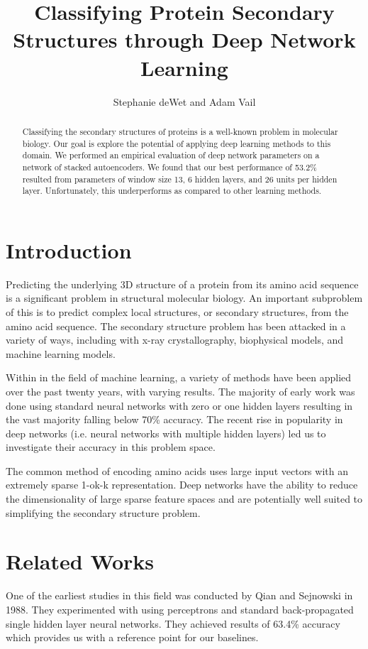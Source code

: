 \documentclass[letterpaper,twocolumn,12pt]{article}
\title{Classifying Protein Secondary Structures through Deep Network Learning}
\author{Stephanie deWet and Adam Vail}
\begin{document}
\maketitle

\begin{abstract}
Classifying the secondary structures of proteins is a well-known problem in molecular biology.
Our goal is explore the potential of applying deep learning methods to this domain.
We performed an empirical evaluation of deep network parameters on a network of stacked autoencoders.
We found that our best performance of 53.2\% resulted from parameters of window size 13, 6 hidden layers, and 26 units per hidden layer.
Unfortunately, this underperforms as compared to other learning methods.
\end{abstract}

\section{Introduction}
\label{subsec:intro}
Predicting the underlying 3D structure of a protein from its amino acid sequence is a significant problem in structural molecular biology.
An important subproblem of this is to predict complex local structures, or secondary structures, from the amino acid sequence.  
The secondary structure problem has been attacked in a variety of ways, including with x-ray crystallography, biophysical models, and machine learning models.

Within in the field of machine learning, a variety of methods have been applied over the past twenty years, with varying results. 
The majority of early work was done using standard neural networks with zero or one hidden layers resulting in the vast majority falling below 70\% accuracy.
The recent rise in popularity in deep networks (i.e. neural networks with multiple hidden layers) led us to investigate their accuracy in this problem space.

The common method of encoding amino acids uses large input vectors with an extremely sparse 1-ok-k representation.
Deep networks have the ability to reduce the dimensionality of large sparse feature spaces and are potentially well suited to simplifying the secondary structure problem.

\section{Related Works}
\label{subsec:relatedworks}
One of the earliest studies in this field was conducted by Qian and Sejnowski \cite{Qian} in 1988.
They experimented with using perceptrons and standard back-propagated single hidden layer neural networks.
They achieved results of 63.4\% accuracy which provides us with a reference point for our baselines.
\end{document}

